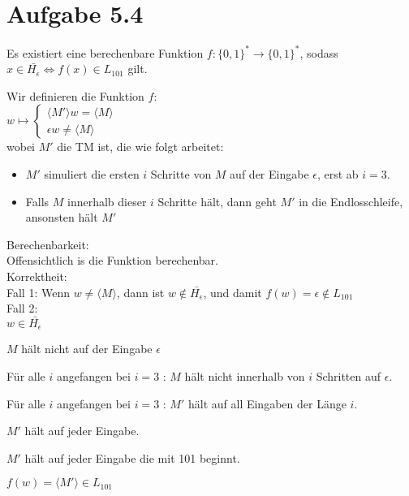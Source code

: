 \documentclass{article}
\begin{document}
				\section[a 5.4]{Aufgabe 5.4}

		Es existiert eine berechenbare Funktion $f : \{0,1\}^* \rightarrow \{0,1\}^*$, sodass  $x \in \bar{H_{\epsilon}}  \Leftrightarrow f(x) \in L_{101}$ gilt.
		
Wir definieren die Funktion $f$:\\
$w \mapsto \begin{cases} \langle M'\rangle w = \langle M \rangle \\ \epsilon w \neq \langle M \rangle \end{cases}$\\
wobei $M'$ die TM ist, die wie folgt arbeitet:\\
\begin{itemize}
\item  $M'$ simuliert die ersten $i$ Schritte von $M$ auf der Eingabe $\epsilon$, erst ab $i=3$.
\item Falls $M$ innerhalb dieser $i$ Schritte hält, dann geht $M'$ in die Endlosschleife, ansonsten hält $M'$
\end{itemize}

Berechenbarkeit:\\
Offensichtlich is die Funktion berechenbar.\\
Korrektheit:\\
Fall 1: Wenn $w \neq \langle M\rangle$, dann ist $w \notin \bar{H_{\epsilon}}$, und damit $f(w) = \epsilon \notin L_{101}$\\
Fall 2:\\
$w \in \bar{H_{\epsilon}}$ \begin{arrowlist} \item $M$ hält nicht auf der Eingabe $\epsilon$

\item Für alle $i$ angefangen bei $i = 3$ : $M$ hält nicht innerhalb von $i$ Schritten auf $\epsilon$.

\item Für alle $i$ angefangen bei $i = 3$ : $M'$ hält auf all Eingaben der Länge $i$.

\item $M'$ hält auf jeder Eingabe.

\item $M'$ hält auf jeder Eingabe die mit 101 beginnt.

\item $f(w) = \langle M' \rangle \in L_{101}$


\end{arrowlist}
\end{document}
